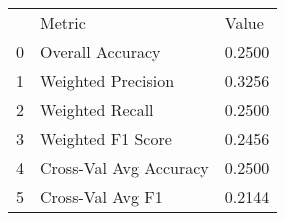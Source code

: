 \begin{tabular}{lll}
 & Metric & Value \\
0 & Overall Accuracy & 0.2500 \\
1 & Weighted Precision & 0.3256 \\
2 & Weighted Recall & 0.2500 \\
3 & Weighted F1 Score & 0.2456 \\
4 & Cross-Val Avg Accuracy & 0.2500 \\
5 & Cross-Val Avg F1 & 0.2144 \\
\end{tabular}
